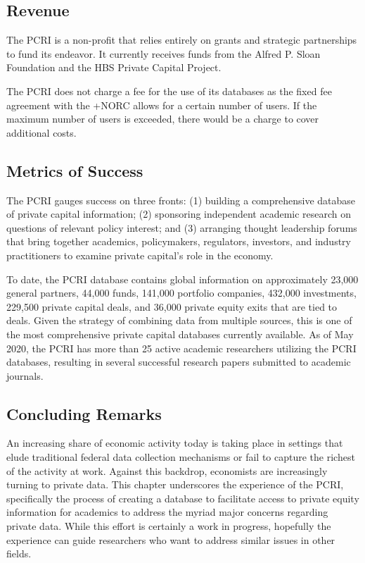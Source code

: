 \documentclass[
]{book}
\begin{document}
\hypertarget{revenue-2}{%
\subsection{Revenue}\label{revenue-2}}

The PCRI is a non-profit that relies entirely on grants and strategic partnerships to fund its endeavor. It currently receives funds from the Alfred P. Sloan Foundation and the HBS Private Capital Project.

The PCRI does not charge a fee for the use of its databases as the fixed fee agreement with the +NORC\textbar{} allows for a certain number of users. If the maximum number of users is exceeded, there would be a charge to cover additional costs.

\hypertarget{metrics-of-success-3}{%
\subsection{Metrics of Success}\label{metrics-of-success-3}}

The PCRI gauges success on three fronts: (1) building a comprehensive database of private capital information; (2) sponsoring independent academic research on questions of relevant policy interest; and (3) arranging thought leadership forums that bring together academics, policymakers, regulators, investors, and industry practitioners to examine private capital's role in the economy.

To date, the PCRI database contains global information on approximately 23,000 general partners, 44,000 funds, 141,000 portfolio companies, 432,000 investments, 229,500 private capital deals, and 36,000 private equity exits that are tied to deals. Given the strategy of combining data from multiple sources, this is one of the most comprehensive private capital databases currently available. As of May 2020, the PCRI has more than 25 active academic researchers utilizing the PCRI databases, resulting in several successful research papers submitted to academic journals.

\hypertarget{concluding-remarks}{%
\subsection{Concluding Remarks}\label{concluding-remarks}}

An increasing share of economic activity today is taking place in settings that elude traditional federal data collection mechanisms or fail to capture the richest of the activity at work. Against this backdrop, economists are increasingly turning to private data. This chapter underscores the experience of the PCRI, specifically the process of creating a database to facilitate access to private equity information for academics to address the myriad major concerns regarding private data. While this effort is certainly a work in progress, hopefully the experience can guide researchers who want to address similar issues in other fields.
\end{document}
